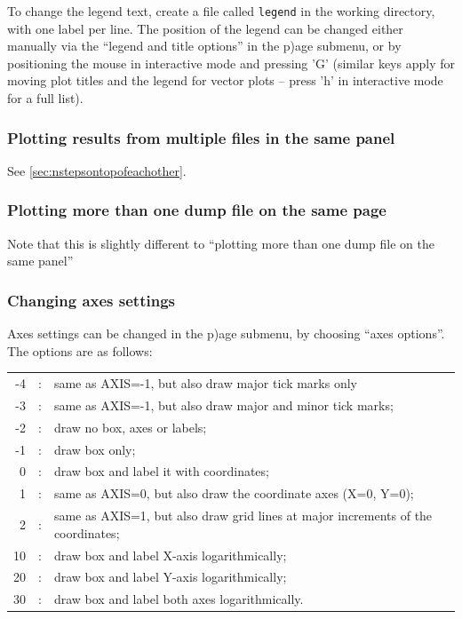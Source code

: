 \documentclass[a4paper,11pt]{article}
\begin{document}
To change the legend text, create a file called \verb+legend+ in the working directory, with one label per line. The position of the legend can be changed either manually via the ``legend and title options'' in the p)age submenu, or by positioning the mouse in interactive mode and pressing 'G' (similar keys apply for moving plot titles and the legend for vector plots -- press 'h' in interactive mode for a full list). 

\subsubsection{ Plotting results from multiple files in the same panel}
 See \ref{sec:nstepsontopofeachother}.

\subsubsection{ Plotting more than one dump file on the same page}
 Note that this is slightly different to ``plotting more than one dump file on the same panel''

\subsubsection{ Changing axes settings}
\label{sec:axessettings}
 Axes settings can be changed in the p)age submenu, by choosing ``axes options''. The options are as follows:
\begin{tabular}{rcp{}}
-4 & : & same as AXIS=-1, but also draw major tick marks only \\
-3 & : & same as AXIS=-1, but also draw major and minor tick marks; \\
 -2 & : & draw no box, axes or labels; \\
 -1 & : & draw box only; \\
  0 & : & draw box and label it with coordinates; \\
  1 & : & same as AXIS=0, but also draw the coordinate axes (X=0, Y=0); \\
  2 & : & same as AXIS=1, but also draw grid lines at major increments of the coordinates; \\
  10 & : & draw box and label X-axis logarithmically; \\
  20 & : & draw box and label Y-axis logarithmically; \\
  30 & : & draw box and label both axes logarithmically. \\
\end{tabular}
\end{document}
